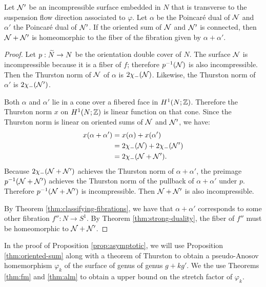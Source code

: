 \begin{prop}
  \label{thm:oriented-sum}
  Let $\mathcal{N}'$ be an incompressible surface embedded in $N$ that is transverse to the suspension flow direction associated to $\varphi$.
  Let $\alpha$ be the Poincar\'e dual of $\mathcal{N}$ and $\alpha'$ the Poincar\'e dual of $\mathcal{N}'$.
  If the oriented sum of $\mathcal{N}$ and $\mathcal{N}'$ is connected, then $\mathcal{N} + \mathcal{N}'$ is homeomorphic to the fiber of the fibration given by $\alpha + \alpha'$.
\end{prop}
\begin{proof}
  Let $p:\widetilde{N}\rightarrow N$ be the orientation double cover of $N$.
  The surface $\mathcal{N}$ is incompressible because it is a fiber of $f$; therefore $p^{-1}(\mathcal{N})$ is also incompressible.  Then the Thurston norm of $\mathcal{N}$ of $\alpha$ is $2\chi_-(\mathcal{N})$.  Likewise, the Thurston norm of $\alpha'$ is $2\chi_-(\mathcal{N}')$.

 Both $\alpha$ and $\alpha'$ lie in a cone over a fibered face in $H^1(N;\mathbb{Z})$.  Therefore the Thurston norm $x$ on $H^1(N;\mathbb{Z})$ is linear function on that cone.
 Since the Thurston norm is linear on oriented sums of $\mathcal{N}$ and $\mathcal{N}'$, we have:
  \begin{align*}
    x(\alpha + \alpha') &= x(\alpha) + x(\alpha') \\
                        &= 2\chi_-(\mathcal{N}) + 2\chi_-(\mathcal{N}') \\
                        &= 2\chi_-(\mathcal{N} + \mathcal{N}').
  \end{align*}
  Because $2\chi_-(\mathcal{N}+\mathcal{N}')$ achieves the Thurston norm of $\alpha+\alpha'$, the preimage $p^{-1}(\mathcal{N}+\mathcal{N}')$ achieves the Thurston norm of the pullback of $\alpha+\alpha'$ under $p$.  Therefore $p^{-1}(\mathcal{N}+\mathcal{N}')$ is incompressible.  Then $\mathcal{N}+\mathcal{N}'$ is also incompressible.


  By Theorem \ref{thm:classifying-fibrations}, we have that $\alpha + \alpha'$ corresponds to some other fibration $f'':N\rightarrow S^1$.
  By Theorem \ref{thm:strong-duality}, the fiber of $f''$ must be homeomorphic to $\mathcal{N} + \mathcal{N}'$.  %
\end{proof}

In the proof of Proposition \ref{prop:asymptotic}, we will use Proposition \ref{thm:oriented-sum} along with a theorem of Thurston to obtain a pseudo-Anosov homemorphism $\varphi_k$ of the surface of genus of genus $g+kg'$.  We the use Theorems \ref{thm:fm} and \ref{thm:alm} to obtain a upper bound on the stretch factor of $\varphi_k$.

